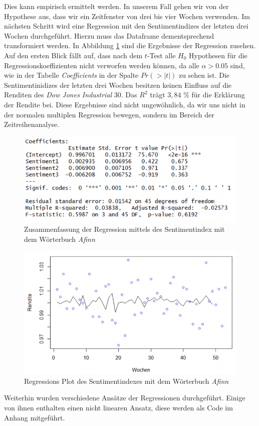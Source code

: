 Dies kann empirisch ermittelt werden. In unserem Fall gehen wir von der Hypothese aus, dass wir ein Zeitfenster von drei bis vier Wochen verwenden. Im nächsten Schritt wird eine Regression mit den Sentimentindizes der letzten drei Wochen durchgeführt. Hierzu muss das Dataframe dementsprechend transformiert werden. In Abbildung \ref{Afinn_summary} sind die Ergebnisse der Regression zusehen. Auf den ersten Blick fällt auf, dass nach dem $t$-Test alle $H_{0}$ Hypothesen für die Regressionskoeffizienten nicht verworfen werden können, da alle $\alpha>0.05$ sind, wie in der Tabelle \textit{Coefficients} in der Spalte $Pr(>|t|)$ zu sehen ist. Die Sentimentinidizes der letzten drei Wochen besitzen keinen Einfluss auf die Renditen des \textit{Dow Jones Industrial} $30$. Das $R^2$ trägt $3,84$ \% für die Erklärung der Rendite bei. Diese Ergebnisse sind nicht ungewöhnlich, da wir uns nicht in der normalen multiplen Regression bewegen, sondern im Bereich der Zeitreihenanalyse.
 \begin{figure}[H]
	\centering
	\includegraphics[width=1\textwidth]{Pictures/afinn_summary.png}
	\caption{Zusammenfassung der Regression mittels des Sentimentindex mit dem Wörterbuch \textit{Afinn} }
	\label{Afinn_summary}
\end{figure} 
\begin{figure}[H]
	\centering
	\includegraphics[width=1\textwidth]{Pictures/Afinn_plot.png}
	\caption{Regressions Plot des Sentimentindexes mit dem Wörterbuch \textit{Afinn} }
	\label{Afinn_plot_regression}
\end{figure} 
Weiterhin wurden verschiedene Ansätze der Regressionen durchgeführt. Einige von ihnen enthalten einen nicht linearen Ansatz, diese werden als Code im Anhang mitgeführt.  

